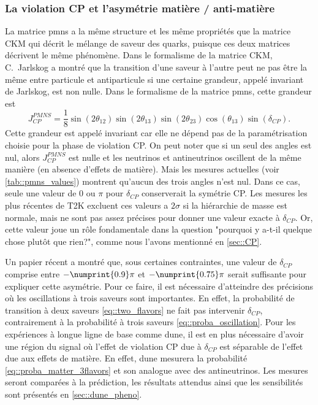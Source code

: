 	        \subsubsection{La violation CP et l'asymétrie matière / anti-matière}\label{sec::CP_violation}
	            La matrice \gls{pmns} a la même structure et les même propriétés que la matrice CKM qui décrit le mélange de saveur des quarks, puisque ces deux matrices décrivent le même phénomène. Dans le formalisme de la matrice CKM, C.~Jarlskog a montré que la transition d'une saveur à l'autre peut ne pas être la même entre particule et antiparticule si une certaine grandeur, appelé invariant de Jarlskog, est non nulle\cite{Jarlskog1985}. Dans le formalisme de la matrice \gls{pmns}, cette grandeur est
	            \begin{equation}
	                J_{CP}^{PMNS}=\frac{1}{8}\sin(2\theta_{12})\sin(2\theta_{13})\sin(2\theta_{23})\cos(\theta_{13})\sin(\delta_{CP}).
	            \end{equation}
	            Cette grandeur est appelé invariant car elle ne dépend pas de la paramétrisation choisie pour la phase de violation CP. On peut noter que si un seul des angles est nul, alors $J_{CP}^{PMNS}$ est nulle et les neutrinos et antineutrinos oscillent de la même manière (en absence d'effets de matière). Mais les mesures actuelles (voir \autoref{tab::pmns_values}) montrent qu'aucun des trois angles n'est nul. Dans ce cas, seule une valeur de $0$ ou $\pi$ pour $\delta_{CP}$ conserverait la symétrie CP. Les mesures les plus récentes de T2K excluent ces valeurs a $2\sigma$\cite{Abe2018} si la hiérarchie de masse est normale, mais ne sont pas assez précises pour donner une valeur exacte à $\delta_{CP}$. Or, cette valeur joue un rôle fondamentale dans la question "pourquoi y a-t-il quelque chose plutôt que rien?", comme nous l'avons mentionné en \autoref{sec::CP}.
	            
	            Un papier récent\cite{Buccella2018}  a montré que, sous certaines contraintes, une valeur de $\delta_{CP}$ comprise entre $-\numprint{0.9}\pi$ et $-\numprint{0.75}\pi$ serait suffisante pour expliquer cette asymétrie. Pour ce faire, il est nécessaire d'atteindre des précisions où les oscillations à trois saveurs sont importantes. En effet, la probabilité de transition à deux saveurs \eqref{eq::two_flavors} ne fait pas intervenir $\delta_{CP}$, contrairement à la probabilité à trois saveurs \eqref{eq::proba_oscillation}. Pour les expériences à longue ligne de base comme \gls{dune}, il est en plus nécessaire d'avoir une région du signal où l'effet de violation CP due à $\delta_{CP}$ est séparable de l'effet due aux effets de matière. En effet,  \gls{dune} mesurera la probabilité \eqref{eq::proba_matter_3flavors} et son analogue avec des antineutrinos. Les mesures seront comparées à la prédiction, les résultats attendus ainsi que les sensibilités sont présentés en \autoref{sec::dune_pheno}.
        
        \printbibliography